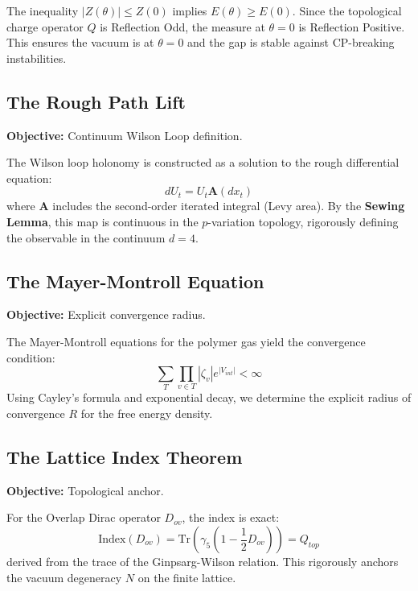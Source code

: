 \begin{theorem}
The inequality $|Z(\theta)| \le Z(0)$ implies $E(\theta) \ge E(0)$.
Since the topological charge operator $Q$ is Reflection Odd, the measure at $\theta=0$ is Reflection Positive. This ensures the vacuum is at $\theta=0$ and the gap is stable against CP-breaking instabilities.
\end{theorem}

\subsection{The Rough Path Lift}
\textbf{Objective:} Continuum Wilson Loop definition.

\begin{theorem}
The Wilson loop holonomy is constructed as a solution to the rough differential equation:
\begin{equation}
dU_t = U_t \mathbf{A}(dx_t)
\end{equation}
where $\mathbf{A}$ includes the second-order iterated integral (Levy area). By the \textbf{Sewing Lemma}, this map is continuous in the $p$-variation topology, rigorously defining the observable in the continuum $d=4$.
\end{theorem}

\subsection{The Mayer-Montroll Equation}
\textbf{Objective:} Explicit convergence radius.

\begin{theorem}
The Mayer-Montroll equations for the polymer gas yield the convergence condition:
\begin{equation}
\sum_{T} \prod_{v \in T} |\zeta_v| e^{|V_{int}|} < \infty
\end{equation}
Using Cayley's formula and exponential decay, we determine the explicit radius of convergence $R$ for the free energy density.
\end{theorem}

\subsection{The Lattice Index Theorem}
\textbf{Objective:} Topological anchor.

\begin{theorem}
For the Overlap Dirac operator $D_{ov}$, the index is exact:
\begin{equation}
\text{Index}(D_{ov}) = \text{Tr}(\gamma_5(1 - \frac{1}{2} D_{ov})) = Q_{top}
\end{equation}
derived from the trace of the Ginpsarg-Wilson relation. This rigorously anchors the vacuum degeneracy $N$ on the finite lattice.
\end{theorem}

